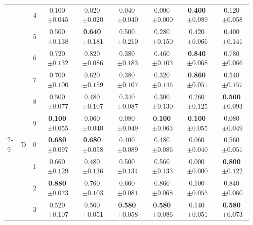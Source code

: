 \begin{longtable}{lllcccccc}
 &  & 4 & 0.100$\,{\scriptstyle\pm0.045}$ & 0.020$\,{\scriptstyle\pm0.020}$ & 0.040$\,{\scriptstyle\pm0.040}$ & 0.000$\,{\scriptstyle\pm0.000}$ & \textbf{0.400}$\,{\scriptstyle\pm0.089}$ & 0.120$\,{\scriptstyle\pm0.058}$ \\
 &  & 5 & 0.500$\,{\scriptstyle\pm0.138}$ & \textbf{0.640}$\,{\scriptstyle\pm0.181}$ & 0.500$\,{\scriptstyle\pm0.210}$ & 0.280$\,{\scriptstyle\pm0.150}$ & 0.420$\,{\scriptstyle\pm0.066}$ & 0.400$\,{\scriptstyle\pm0.141}$ \\
 &  & 6 & 0.720$\,{\scriptstyle\pm0.132}$ & 0.820$\,{\scriptstyle\pm0.086}$ & 0.380$\,{\scriptstyle\pm0.183}$ & 0.460$\,{\scriptstyle\pm0.103}$ & \textbf{0.840}$\,{\scriptstyle\pm0.068}$ & 0.780$\,{\scriptstyle\pm0.066}$ \\
 &  & 7 & 0.700$\,{\scriptstyle\pm0.100}$ & 0.620$\,{\scriptstyle\pm0.159}$ & 0.380$\,{\scriptstyle\pm0.107}$ & 0.320$\,{\scriptstyle\pm0.146}$ & \textbf{0.860}$\,{\scriptstyle\pm0.051}$ & 0.540$\,{\scriptstyle\pm0.157}$ \\
 &  & 8 & 0.500$\,{\scriptstyle\pm0.077}$ & 0.480$\,{\scriptstyle\pm0.107}$ & 0.340$\,{\scriptstyle\pm0.087}$ & 0.300$\,{\scriptstyle\pm0.130}$ & 0.260$\,{\scriptstyle\pm0.125}$ & \textbf{0.560}$\,{\scriptstyle\pm0.093}$ \\
 &  & 9 & \textbf{0.100}$\,{\scriptstyle\pm0.055}$ & 0.060$\,{\scriptstyle\pm0.040}$ & 0.080$\,{\scriptstyle\pm0.049}$ & \textbf{0.100}$\,{\scriptstyle\pm0.063}$ & \textbf{0.100}$\,{\scriptstyle\pm0.055}$ & 0.080$\,{\scriptstyle\pm0.049}$ \\
\cmidrule(lr){2-9}
 & D & 0 & \textbf{0.680}$\,{\scriptstyle\pm0.097}$ & \textbf{0.680}$\,{\scriptstyle\pm0.058}$ & 0.400$\,{\scriptstyle\pm0.089}$ & 0.480$\,{\scriptstyle\pm0.086}$ & 0.060$\,{\scriptstyle\pm0.040}$ & 0.560$\,{\scriptstyle\pm0.051}$ \\
 &  & 1 & 0.660$\,{\scriptstyle\pm0.129}$ & 0.480$\,{\scriptstyle\pm0.136}$ & 0.500$\,{\scriptstyle\pm0.134}$ & 0.560$\,{\scriptstyle\pm0.133}$ & 0.000$\,{\scriptstyle\pm0.000}$ & \textbf{0.800}$\,{\scriptstyle\pm0.122}$ \\
 &  & 2 & \textbf{0.880}$\,{\scriptstyle\pm0.073}$ & 0.760$\,{\scriptstyle\pm0.103}$ & 0.660$\,{\scriptstyle\pm0.081}$ & 0.860$\,{\scriptstyle\pm0.068}$ & 0.100$\,{\scriptstyle\pm0.055}$ & 0.840$\,{\scriptstyle\pm0.060}$ \\
 &  & 3 & 0.520$\,{\scriptstyle\pm0.107}$ & 0.560$\,{\scriptstyle\pm0.051}$ & \textbf{0.580}$\,{\scriptstyle\pm0.058}$ & \textbf{0.580}$\,{\scriptstyle\pm0.086}$ & 0.140$\,{\scriptstyle\pm0.051}$ & \textbf{0.580}$\,{\scriptstyle\pm0.073}$ \\

\end{longtable}
